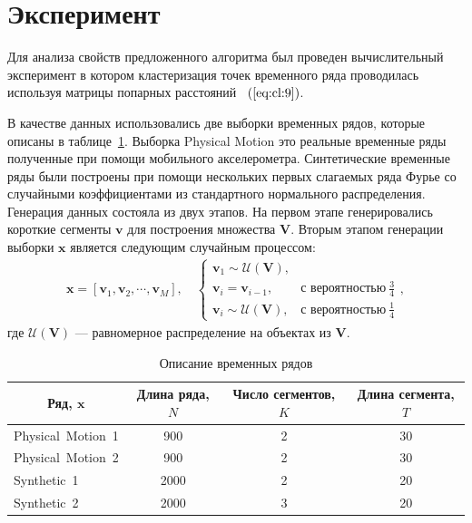 \documentclass[12pt, twoside]{article}
\numberwithin{equation}{section}
\begin{document}
\section{Эксперимент}
Для анализа свойств предложенного алгоритма был проведен вычислительный эксперимент в котором кластеризация точек временного ряда проводилась используя матрицы попарных расстояний ~$(\ref{eq:cl:9})$.

В качестве данных использовались две выборки временных рядов, которые описаны в таблице~\ref{table_1}. Выборка Physical Motion это реальные временные ряды полученные при помощи мобильного акселерометра. Синтетические временные ряды были построены при помощи нескольких первых слагаемых ряда Фурье со случайными коэффициентами из стандартного нормального распределения. Генерация данных состояла из двух этапов. На первом этапе генерировались короткие сегменты $\textbf{v}$ для построения множества $\mathbf{V}$. Вторым этапом генерации выборки $\textbf{x}$ является следующим случайным процессом:
\begin{equation}
\label{eq:exp:1}
\begin{aligned}
\textbf{x} = [\textbf{v}_{1}, \textbf{v}_{2}, \cdots, \textbf{v}_{M}], \quad \begin{cases}
    \textbf{v}_{1} \sim \mathcal{U}\left(\mathbf{V}\right),\\
    \textbf{v}_{i} = \textbf{v}_{i - 1}, & \text{с вероятностью}~\frac{3}{4}\\
    \textbf{v}_{i} \sim \mathcal{U}\left(\mathbf{V}\right), & \text{с вероятностью}~\frac{1}{4}
\end{cases},
\end{aligned}
\end{equation}
где $\mathcal{U}\left(\mathbf{V}\right)$ --- равномерное распределение на объектах из $\mathbf{V}$.

\begin{table}[h!t]
\begin{center}
\caption{Описание временных рядов}
\label{table_1}
\begin{tabular}{|c|c|c|c|}
\hline
	Ряд, $\textbf{x}$ &Длина ряда, $N$& Число сегментов, $K$&Длина сегмента, $T$\\
	\hline
	\multicolumn{1}{|l|}{Physical~Motion~1}
	& 900& 2& 30\\
	\hline
	\multicolumn{1}{|l|}{Physical~Motion~2}
	& 900& 2& 30\\
	\hline
	\multicolumn{1}{|l|}{Synthetic~1}
	& 2000& 2& 20\\
	\hline
	\multicolumn{1}{|l|}{Synthetic~2}
	& 2000& 3& 20\\
\hline

\end{tabular}
\end{center}
\end{table}
\end{document}
